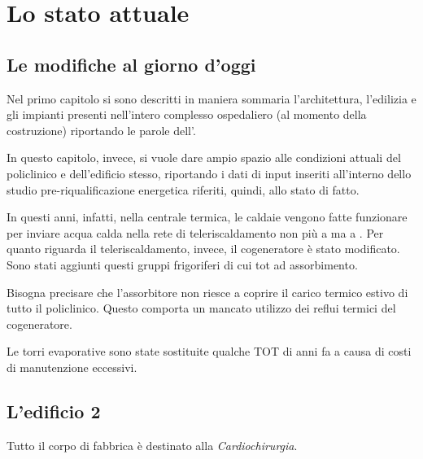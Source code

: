 \chapter{Lo stato attuale}
\thispagestyle{empty}
\section{Le modifiche al giorno d'oggi}
Nel primo capitolo si sono descritti in maniera sommaria l'architettura, l'edilizia e gli impianti presenti nell'intero complesso ospedaliero (al momento della costruzione) riportando le parole dell'. 

In questo capitolo, invece, si vuole dare ampio spazio alle condizioni attuali del policlinico e dell'edificio stesso, riportando i dati di input inseriti all'interno dello studio pre-riqualificazione energetica riferiti, quindi, allo stato di fatto. 

In questi anni, infatti, nella centrale termica, le caldaie vengono fatte funzionare per inviare acqua calda nella rete di teleriscaldamento non più a  ma a . Per quanto riguarda il teleriscaldamento, invece, il cogeneratore è stato modificato. Sono stati aggiunti questi gruppi frigoriferi di cui tot ad assorbimento.

Bisogna precisare che l'assorbitore non riesce a coprire il carico termico estivo di tutto il policlinico. Questo comporta un mancato utilizzo dei reflui termici del cogeneratore.

Le torri evaporative sono state sostituite qualche TOT di anni fa a causa di costi di manutenzione eccessivi.
\clearpage
\section{L'edificio 2}
Tutto il corpo di fabbrica è destinato alla \emph{Cardiochirurgia}.

